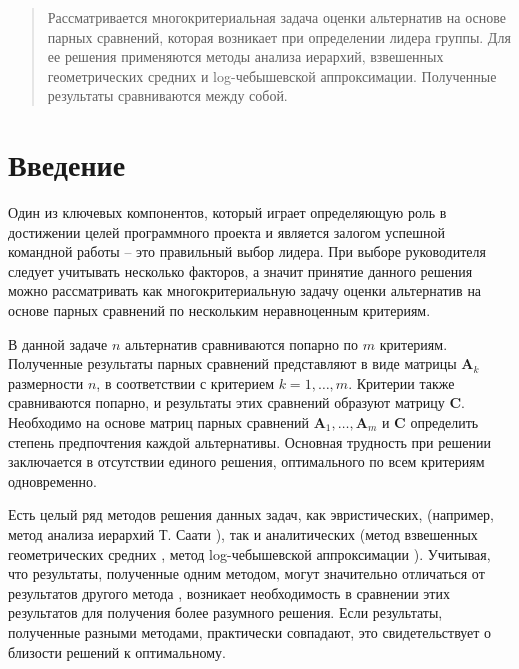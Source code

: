 \documentclass{math-mech-sci}
\begin{document}
\maketitle

\begin{abstract}
Рассматривается многокритериальная задача оценки альтернатив на основе парных сравнений, которая возникает при определении лидера группы. Для ее решения применяются методы анализа иерархий, взвешенных геометрических средних и log-чебышевской аппроксимации. Полученные результаты сравниваются между собой.  
\end{abstract}

\section{Введение}

Один из ключевых компонентов, который играет определяющую роль в достижении целей программного проекта и является залогом  успешной командной работы -- это правильный выбор лидера. При выборе руководителя следует учитывать несколько факторов, а значит принятие данного решения можно рассматривать как многокритериальную задачу оценки альтернатив на основе парных сравнений по нескольким неравноценным критериям. 

В данной задаче $n$ альтернатив сравниваются попарно по $m$ критериям. 
Полученные результаты парных сравнений представляют в виде матрицы $\boldsymbol{A}_k$ размерности $n$, в соответствии с критерием  $k=1,\ldots,m$.
Критерии также сравниваются попарно, и результаты этих сравнений образуют матрицу $\boldsymbol{C}$. Необходимо на основе матриц парных сравнений $\boldsymbol{A}_1, \ldots, \boldsymbol{A}_m$ и $\boldsymbol{C}$ определить степень предпочтения каждой альтернативы. Основная трудность при решении заключается в отсутствии единого решения, оптимального по всем критериям одновременно.


Есть целый ряд методов решения данных задач, как эвристических, (например, метод анализа иерархий Т. Саати \cite{Saaty}), так и аналитических (метод взвешенных геометрических средних \cite{Crawford}, метод log-чебышевской
аппроксимации \cite{Krivulin2024Application}). Учитывая, что результаты, полученные одним методом, могут значительно отличаться от результатов другого метода \cite{Tran}, возникает необходимость в сравнении этих результатов для получения более разумного решения. Если результаты, полученные разными методами, практически совпадают, это свидетельствует о близости решений к оптимальному.
\end{document}
